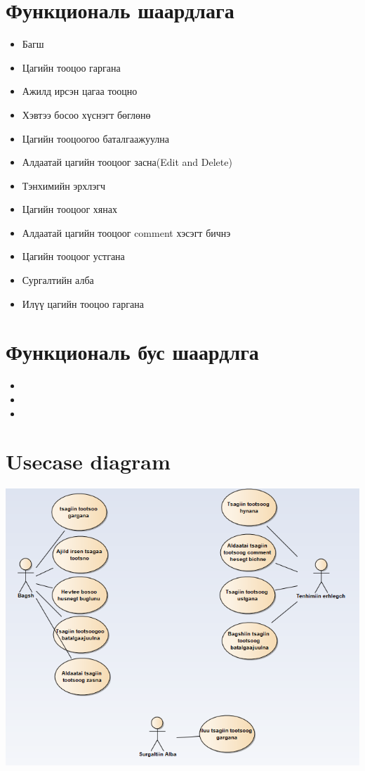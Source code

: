 \documentclass[12pd]{article}
\begin{document}
	\section{Функциональ шаардлага}
	\begin{itemize}
		\item Багш
		\item Цагийн тооцоо гаргана 
		\item Ажилд ирсэн цагаа тооцно 
		\item Хэвтээ босоо хүснэгт бөглөнө 
		\item Цагийн тооцоогоо баталгаажуулна 
		\item Алдаатай цагийн тооцоог засна(Edit and Delete)
		\item Тэнхимийн эрхлэгч 
		\item Цагийн тооцоог хянах 
		\item Алдаатай цагийн тооцоог comment хэсэгт бичнэ
		\item Цагийн тооцоог устгана 
		\item Сургалтийн алба 
		\item Илүү цагийн тооцоо гаргана
		
		
		
		
		
		
	\end{itemize}
	\section{Функциональ бус шаардлга}
	\begin{itemize}
		\item 
		\item
		\item
	\end{itemize}
	\section{Usecase diagram}
	\includegraphics[width=\textwidth]{usecase}
\end{document}
